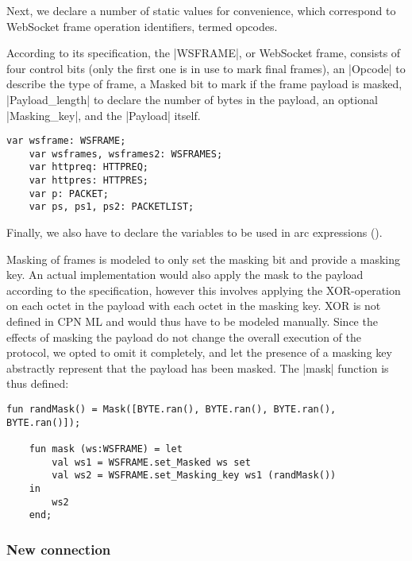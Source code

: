 	Next, we declare a number of static values for convenience, which correspond to
	WebSocket frame operation identifiers, termed opcodes. 
	
	According to its specification, the |WSFRAME|, or WebSocket frame, consists
	of four control bits (only the first one is in use to mark final frames), an
	|Opcode| to describe the type of frame, a Masked bit to mark if the frame
	payload is masked, |Payload_length| to declare the number of bytes in the
	payload, an optional |Masking_key|, and the |Payload| itself. 
	
	\begin{lstlisting}[label=lst:client_lib_vars,caption=WebSocket
	Module Variables,gobble=1,float=h] 
	var wsframe: WSFRAME;
	var wsframes, wsframes2: WSFRAMES;
	var httpreq: HTTPREQ;
	var httpres: HTTPRES;
	var p: PACKET;
	var ps, ps1, ps2: PACKETLIST;
	\end{lstlisting}
	
	Finally, we also have to declare the variables to be used in arc expressions
	().
	
	Masking of frames is modeled to only set the masking bit and provide a masking
	key. An actual implementation would also apply the mask to the payload
	according to the specification, however this involves applying the
	XOR-operation on each octet in the payload with each octet in the masking key.
	XOR is not defined in CPN ML and would thus have to be modeled manually. Since
	the effects of masking the payload do not change the overall execution of the
	protocol, we opted to omit it completely, and let the presence of a masking key
	abstractly represent that the payload has been masked. The |mask| function is
	thus defined:
	
	\begin{lstlisting}[label=lst:mask_fun,caption=Masking functions
	,gobble=1,float=h]
	fun randMask() = Mask([BYTE.ran(), BYTE.ran(), BYTE.ran(), BYTE.ran()]);
  
	fun mask (ws:WSFRAME) = let
		val ws1 = WSFRAME.set_Masked ws set
		val ws2 = WSFRAME.set_Masking_key ws1 (randMask())
	in 
		ws2
	end;
	\end{lstlisting}
     
	\subsubsection{New connection}
		
		
